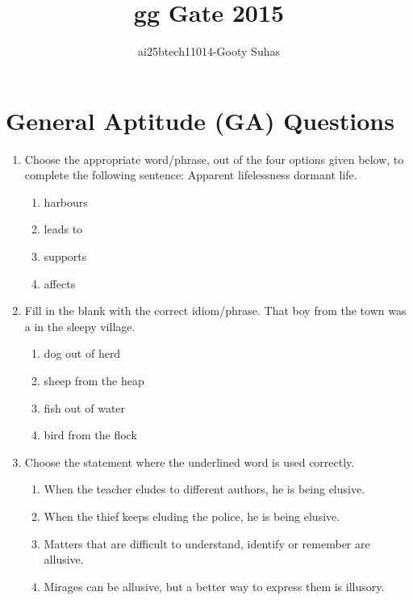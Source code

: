 \documentclass[journal,12pt,onecolumn]{IEEEtran}
\theoremstyle{remark}
\begin{document}
\title{gg Gate 2015}
\author{ai25btech11014-Gooty Suhas}
\maketitle
\section*{General Aptitude (GA) Questions}

\begin{enumerate}
\item Choose the appropriate word/phrase, out of the four options given below, to complete the following sentence:  
Apparent lifelessness \underline{\hspace{1cm}} dormant life.  
\begin{multicols}{4}
\begin{enumerate}
\item harbours  
\item leads to  
\item supports  
\item affects  
\end{enumerate}
\end{multicols}

\item Fill in the blank with the correct idiom/phrase.  
That boy from the town was a \underline{\hspace{1cm}} in the sleepy village.  
\begin{multicols}{2}
\begin{enumerate}
\item dog out of herd  
\item sheep from the heap  
\item fish out of water  
\item bird from the flock  
\end{enumerate}
\end{multicols}

\item Choose the statement where the underlined word is used correctly.  
\begin{enumerate}
\item When the teacher eludes to different authors, he is being elusive.  
\item When the thief keeps eluding the police, he is being elusive.  
\item Matters that are difficult to understand, identify or remember are allusive.  
\item Mirages can be allusive, but a better way to express them is illusory.  
\end{enumerate}


\end{enumerate}
\end{document}
